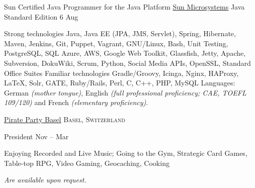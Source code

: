 \documentclass[10pt,a4paper]{article}
\begin{document}
\headedsection
  {Sun Certified Java Programmer for the Java Platform}
  {\href{http://education.oracle.com/}{Sun Microsystems}} {%
  \headedsubsection
    {Java Standard Edition 6}
    {Aug }
    {}
}

\spacedhrule{0.8em}{-0.4em}


\inlineheadsection  %
  {Strong technologies}
  {Java, Java EE (JPA, JMS, Servlet), Spring, Hibernate, Maven, Jenkins, Git, Puppet, Vagrant, GNU/Linux, Bash, Unit Testing, PostgreSQL, SQL Azure, AWS, Google Web Toolkit, Glassfish, Jetty, Apache, Subversion, DokuWiki, Scrum, Python, Social Media APIs, OpenSSL, Standard Office Suites}
\vspace{0.5em}
\inlineheadsection
  {Familiar technologies}
  {Gradle/Groovy, Icinga, Nginx, HAProxy, LaTeX, Solr, GATE, Ruby/Rails, Perl, C, C++, PHP, MySQL }
\vspace{0.5em}
\inlineheadsection
  {Languages:}
  {German \emph{(mother tongue)}, English \emph{(full professional proficiency; CAE, TOEFL 109/120)} and French \emph{(elementary proficiency)}.}

\spacedhrule{1.9em}{-0.4em}


\headedsection  %
  {\href{http://www.piraten-basel.ch/}{Pirate Party Basel}}
  {\textsc{Basel, Switzerland}} {%

  \headedsubsection  %
    {President}
    {Nov  -- Mar }
    {}
}

\spacedhrule{1.1em}{-0.4em}


Enjoying Recorded and Live Music; Going to the Gym, Strategic Card Games, Table-top RPG, Video Gaming, Geocaching, Cooking

\spacedhrule{1.8em}{-0.4em}

\emph{Are available upon request.}
\end{document}
